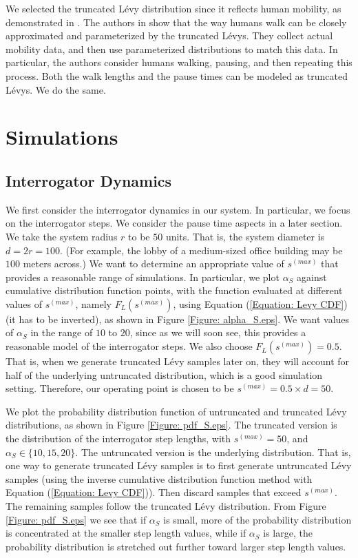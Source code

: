 We selected the truncated L\'{e}vy distribution since it reflects human mobility, as demonstrated in \cite{2008 Rhee}. The authors in \cite{2008 Rhee} show that the way humans walk can be closely approximated and parameterized by the truncated L\'{e}vys. They collect actual mobility data, and then use parameterized distributions to match this data. In particular, the authors consider humans walking, pausing, and then repeating this process. Both the walk lengths and the pause times can be modeled as truncated L\'{e}vys. We do the same. 

\section{Simulations}

\subsection{Interrogator Dynamics}
We first consider the interrogator dynamics in our system. In particular, we focus on the interrogator steps. We consider the pause time aspects in a later section. We take the system radius $r$ to be $50$ units. That is, the system diameter is $d = 2r = 100$. (For example, the lobby of a medium-sized office building may be $100$ meters across.) We want to determine an appropriate value of $s^{(max)}$ that provides a reasonable range of simulations. In particular, we plot $\alpha_S$ against cumulative distribution function points, with the function evaluated at different values of $s^{(max)}$, namely $F_L\left(s^{(max)}\right)$, using Equation (\ref{Equation: Levy CDF}) (it has to be inverted), as shown in Figure \ref{Figure: alpha_S.eps}. We want values of $\alpha_S$ in the range of $10$ to $20$, since as we will soon see, this provides a reasonable model of the interrogator steps. We also choose $F_L\left(s^{(max)}\right) = 0.5$. That is, when we generate truncated L\'{e}vy samples later on, they will account for half of the underlying untruncated distribution, which is a good simulation setting. Therefore, our operating point is chosen to be $s^{(max)} = 0.5 \times d = 50$.

We plot the probability distribution function of untruncated and truncated L\'{e}vy distributions, as shown in Figure \ref{Figure: pdf_S.eps}. The truncated version is the distribution of the interrogator step lengths, with $s^{(max)} = 50$, and $\alpha_S \in \{10, 15, 20\}$. The untruncated version is the underlying distribution. That is, one way to generate truncated L\'{e}vy samples is to first generate untruncated L\'{e}vy samples (using the inverse cumulative distribution function method with Equation (\ref{Equation: Levy CDF})). Then discard samples that exceed $s^{(max)}$. The remaining samples follow the truncated L\'{e}vy distribution. From Figure \ref{Figure: pdf_S.eps} we see that if $\alpha_S$ is small, more of the probability distribution is concentrated at the smaller step length values, while if $\alpha_S$ is large, the probability distribution is stretched out further toward larger step length values.

